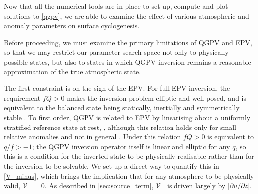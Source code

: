 \documentclass{article}
\begin{document}
Now that all the numerical tools are in place to set up, compute and plot solutions to \cref{qgpv}, we are able to examine the effect of various atmospheric and anomaly parameters on surface cyclogenesis.

Before proceeding, we must examine the primary limitations of QGPV and EPV, so that we may restrict our parameter search space not only to physically possible states, but also to states in which QGPV inversion remains a reasonable approximation of the true atmospheric state.

The first constraint is on the sign of the EPV.
For full EPV inversion, the requirement $fQ>0$ makes the inversion problem elliptic and well posed, and is equivalent to the balanced state being statically, inertially and symmetrically stable \cite{Hoskins1985}.
To first order, QGPV is related to EPV by linearising about a uniformly stratified reference state at rest, \cite{fehlmann1997pvelements}, although this relation holds only for small relative anomalies and not in general \cite{Hoskins1985}.
Under this relation $fQ>0$ is equivalent to $q/f > -1$; the QGPV inversion operator itself is linear and elliptic for any $q$, so this is a condition for the inverted state to be physically realisable rather than for the inversion to be solvable.
We set up a direct way to quantify this in \cref{V_minus}, which brings the implication that for any atmosphere to be physically valid, $\mathcal{V}_-=0$.
As described in \cref{sec:source_term}, $\mathcal{V}_-$ is driven largely by $|\partial \overline u / \partial z|$.
\end{document}
